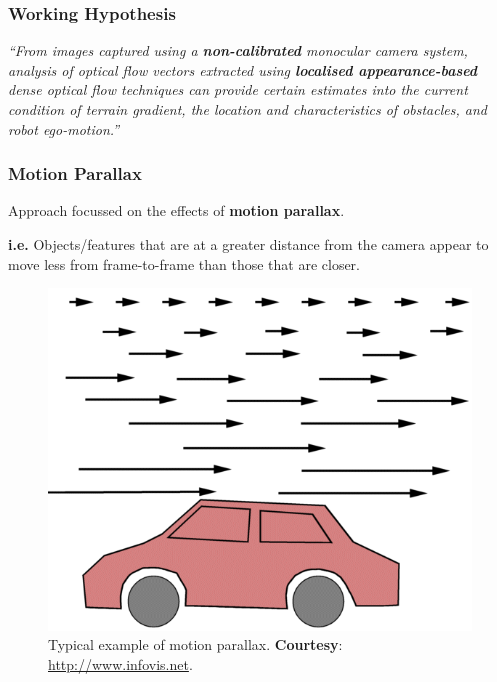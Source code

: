 \documentclass[10pt, compress]{beamer}
\begin{document}

\begin{frame}[fragile]
  \frametitle{Working Hypothesis}

	\hspace*{20pt} \textit{``From images captured using a \textbf{non-calibrated} monocular camera system, analysis of optical flow vectors extracted using \textbf{localised appearance-based} dense optical flow techniques can provide certain estimates into the current condition of terrain gradient, the location and characteristics of obstacles, and robot ego-motion.''}

\end{frame}

\begin{frame}[fragile]
  \frametitle{Motion Parallax}

  Approach focussed on the effects of \textbf{motion parallax}. \\ \vspace{0.5cm}
  
  \textbf{i.e.} Objects/features that are at a greater distance from the camera appear to  move less from frame-to-frame than those that are closer.
  
\begin{figure}[ht!]
\centering
\includegraphics[scale=0.2]{motion_parallax.png}
    \caption{Typical example of motion parallax. \textbf{Courtesy}: \href{http://www.infovis.net}{http://www.infovis.net}.}
  \end{figure}
  
\end{frame}
\end{document}
